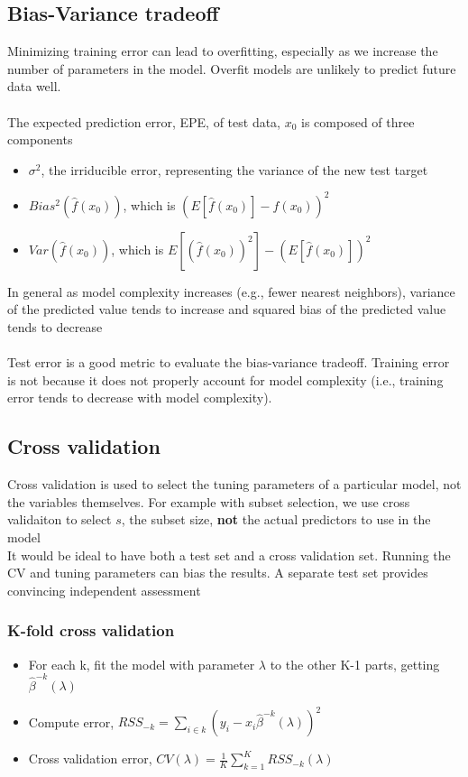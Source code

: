 \documentclass{article}
\begin{document}
\subsection{Bias-Variance tradeoff}
Minimizing training error can lead to overfitting, especially as we increase the number of parameters in the model. Overfit models are unlikely to predict future data well.\\\\
The expected prediction error, EPE, of test data, $x_0$ is composed of three components
\begin{itemize}
  \item $\sigma^2$, the irriducible error, representing the variance of the new test target
  \item $Bias^2(\hat{f}(x_0))$, which is $(E[\hat{f}(x_0)] - f(x_0))^2$
  \item $Var(\hat{f}(x_0))$, which is $E[(\hat{f}(x_0))^2] - (E[\hat{f}(x_0)])^2$
\end{itemize}
In general as model complexity increases (e.g., fewer nearest neighbors), variance of the predicted value tends to increase and squared bias of the predicted value tends to decrease\\\\
Test error is a good metric to evaluate the bias-variance tradeoff. Training error is not because it does not properly account for model complexity (i.e., training error tends to decrease with model complexity).


\subsection{Cross validation}
Cross validation is used to select the tuning parameters of a particular model, not the variables themselves. For example with subset selection, we use cross validaiton to select $s$, the subset size, \textbf{not} the actual predictors to use in the model\\
It would be ideal to have both a test set and a cross validation set. Running the CV and tuning parameters can bias the results. A separate test set provides convincing independent assessment

\subsubsection{K-fold cross validation}
\begin{itemize}
  \item For each k, fit the model with parameter $\lambda$ to the other K-1 parts, getting $\hat{\beta}^{-k}(\lambda)$
  \item Compute error, $RSS_{-k} = \sum_{i \in k}(y_i - x_i\hat{\beta}^{-k}(\lambda))^2$
  \item Cross validation error, $CV(\lambda) = \frac{1}{K}\sum_{k=1}^KRSS_{-k}(\lambda)$
\end{itemize}
\end{document}
